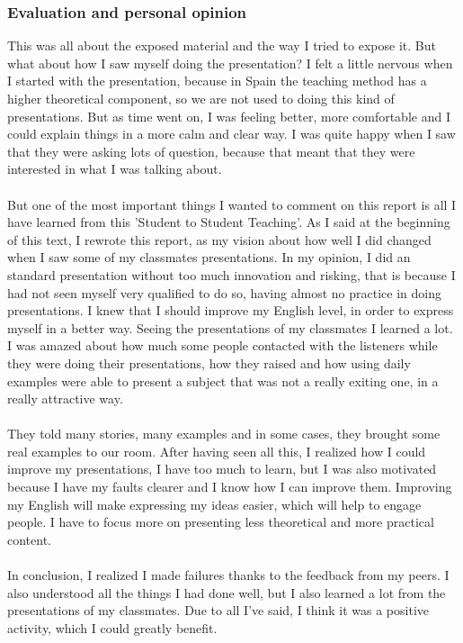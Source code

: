 \subsubsection{Evaluation and personal opinion}
This was all about the exposed material and the way I tried to expose it. But what about how I saw myself doing the presentation? I felt a little nervous 
when I started with the presentation, because in Spain the teaching method has a higher theoretical component, so we are not used to doing this kind of 
presentations. But as time went on, I was feeling better, more comfortable and I could explain things in a more calm and clear way. I was quite happy 
when I saw that they were asking lots of question, because that meant that they were interested in what I was talking about.\\\\
But one of the most important things I wanted to comment on this report is all I have learned from this 'Student to Student Teaching'. As I said at the 
beginning of this text, I rewrote this report, as my vision about how well I did changed when I saw some of my classmates presentations. In my opinion, 
I did an standard presentation without too much innovation and risking, that is because I had not seen myself very qualified to do so, having almost no practice 
in doing presentations. I knew that I should improve my English level, in order to express myself in a better way. Seeing the presentations of my
 classmates I learned a lot. I was amazed about how much some people contacted with the listeners while they were doing their presentations, how they raised 
and how using daily examples were able to present a subject that was not a really exiting one, in a really attractive way.\\\\
They told many stories, many examples and in some cases, they brought some real examples to our room. After having seen all this, I realized how I could improve my
 presentations, I have too much to learn, but I was also motivated because I have my faults clearer and I know how I can improve them. Improving my English will 
make expressing my ideas easier, which will help to engage people. I have to focus more on presenting less theoretical and more practical content.\\\\
In conclusion, I realized I made failures thanks to the feedback from my peers. I also understood all the things I had done well, but I also learned a lot from 
the presentations of my classmates. Due to all I've said, I think it was a positive activity, which I could greatly benefit.

